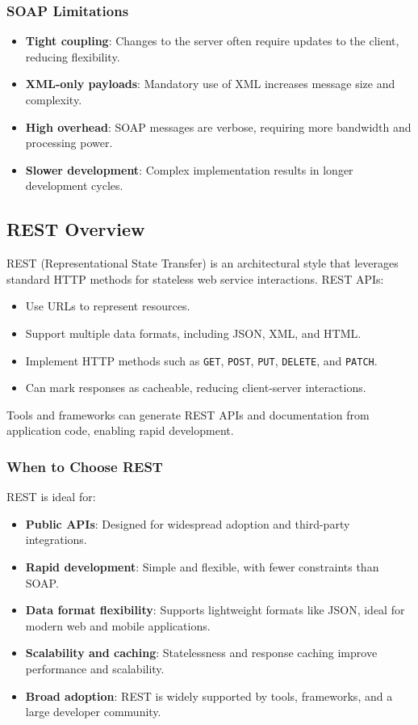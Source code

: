 \documentclass[12pt]{article}
\begin{document}
\subsubsection*{SOAP Limitations}

\begin{itemize}[leftmargin=1.5em]
    \item \textbf{Tight coupling}: Changes to the server often require updates to the client, reducing flexibility.
    \item \textbf{XML-only payloads}: Mandatory use of XML increases message size and complexity.
    \item \textbf{High overhead}: SOAP messages are verbose, requiring more bandwidth and processing power.
    \item \textbf{Slower development}: Complex implementation results in longer development cycles.
\end{itemize}

\subsection{REST Overview}

REST (Representational State Transfer) is an architectural style that leverages standard HTTP methods for stateless web service interactions. REST APIs:

\begin{itemize}[leftmargin=1.5em]
    \item Use URLs to represent resources.
    \item Support multiple data formats, including JSON, XML, and HTML.
    \item Implement HTTP methods such as \texttt{GET}, \texttt{POST}, \texttt{PUT}, \texttt{DELETE}, and \texttt{PATCH}.
    \item Can mark responses as cacheable, reducing client-server interactions.
\end{itemize}

Tools and frameworks can generate REST APIs and documentation from application code, enabling rapid development.

\subsubsection*{When to Choose REST}

REST is ideal for:
\begin{itemize}[leftmargin=1.5em]
    \item \textbf{Public APIs}: Designed for widespread adoption and third-party integrations.
    \item \textbf{Rapid development}: Simple and flexible, with fewer constraints than SOAP.
    \item \textbf{Data format flexibility}: Supports lightweight formats like JSON, ideal for modern web and mobile applications.
    \item \textbf{Scalability and caching}: Statelessness and response caching improve performance and scalability.
    \item \textbf{Broad adoption}: REST is widely supported by tools, frameworks, and a large developer community.
\end{itemize}
\end{document}
